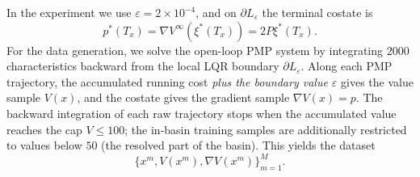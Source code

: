 \documentclass[11pt]{amsart}
\theoremstyle{definition}
\theoremstyle{remark}
\begin{document}
In the experiment we use $\varepsilon=2\times 10^{-4}$, and on $\partial L_\varepsilon$ the terminal costate is
\begin{equation*}
	p^*(T_x)=\nabla V^\infty(\xi^*(T_x))=2P\xi^*(T_x).
\end{equation*}
For the data generation, we solve the open-loop PMP system by integrating $2000$ characteristics backward from the local LQR boundary $\partial L_\varepsilon$.
Along each PMP trajectory, the accumulated running cost \emph{plus the boundary value $\varepsilon$} gives the value sample $V(x)$, and the costate gives the gradient sample $\nabla V(x)=p$.
The backward integration of each raw trajectory stops when the accumulated value reaches the cap $V \le 100$; the in-basin training samples are additionally restricted to values below $50$ (the resolved part of the basin).
This yields the dataset
\begin{equation*}
\{x^m,V(x^m),\nabla V(x^m)\}_{m=1}^M .
\end{equation*}
\end{document}
